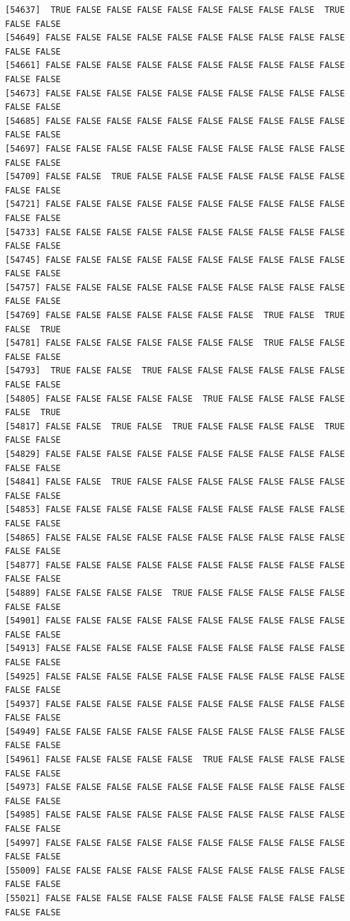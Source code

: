\documentclass[
  a4paper,
  DIV=11,
  numbers=noendperiod]{scrartcl}
\begin{document}
\begin{verbatim}
[54637]  TRUE FALSE FALSE FALSE FALSE FALSE FALSE FALSE FALSE  TRUE FALSE FALSE
[54649] FALSE FALSE FALSE FALSE FALSE FALSE FALSE FALSE FALSE FALSE FALSE FALSE
[54661] FALSE FALSE FALSE FALSE FALSE FALSE FALSE FALSE FALSE FALSE FALSE FALSE
[54673] FALSE FALSE FALSE FALSE FALSE FALSE FALSE FALSE FALSE FALSE FALSE FALSE
[54685] FALSE FALSE FALSE FALSE FALSE FALSE FALSE FALSE FALSE FALSE FALSE FALSE
[54697] FALSE FALSE FALSE FALSE FALSE FALSE FALSE FALSE FALSE FALSE FALSE FALSE
[54709] FALSE FALSE  TRUE FALSE FALSE FALSE FALSE FALSE FALSE FALSE FALSE FALSE
[54721] FALSE FALSE FALSE FALSE FALSE FALSE FALSE FALSE FALSE FALSE FALSE FALSE
[54733] FALSE FALSE FALSE FALSE FALSE FALSE FALSE FALSE FALSE FALSE FALSE FALSE
[54745] FALSE FALSE FALSE FALSE FALSE FALSE FALSE FALSE FALSE FALSE FALSE FALSE
[54757] FALSE FALSE FALSE FALSE FALSE FALSE FALSE FALSE FALSE FALSE FALSE FALSE
[54769] FALSE FALSE FALSE FALSE FALSE FALSE FALSE  TRUE FALSE  TRUE FALSE  TRUE
[54781] FALSE FALSE FALSE FALSE FALSE FALSE FALSE  TRUE FALSE FALSE FALSE FALSE
[54793]  TRUE FALSE FALSE  TRUE FALSE FALSE FALSE FALSE FALSE FALSE FALSE FALSE
[54805] FALSE FALSE FALSE FALSE FALSE  TRUE FALSE FALSE FALSE FALSE FALSE  TRUE
[54817] FALSE FALSE  TRUE FALSE  TRUE FALSE FALSE FALSE FALSE  TRUE FALSE FALSE
[54829] FALSE FALSE FALSE FALSE FALSE FALSE FALSE FALSE FALSE FALSE FALSE FALSE
[54841] FALSE FALSE  TRUE FALSE FALSE FALSE FALSE FALSE FALSE FALSE FALSE FALSE
[54853] FALSE FALSE FALSE FALSE FALSE FALSE FALSE FALSE FALSE FALSE FALSE FALSE
[54865] FALSE FALSE FALSE FALSE FALSE FALSE FALSE FALSE FALSE FALSE FALSE FALSE
[54877] FALSE FALSE FALSE FALSE FALSE FALSE FALSE FALSE FALSE FALSE FALSE FALSE
[54889] FALSE FALSE FALSE FALSE  TRUE FALSE FALSE FALSE FALSE FALSE FALSE FALSE
[54901] FALSE FALSE FALSE FALSE FALSE FALSE FALSE FALSE FALSE FALSE FALSE FALSE
[54913] FALSE FALSE FALSE FALSE FALSE FALSE FALSE FALSE FALSE FALSE FALSE FALSE
[54925] FALSE FALSE FALSE FALSE FALSE FALSE FALSE FALSE FALSE FALSE FALSE FALSE
[54937] FALSE FALSE FALSE FALSE FALSE FALSE FALSE FALSE FALSE FALSE FALSE FALSE
[54949] FALSE FALSE FALSE FALSE FALSE FALSE FALSE FALSE FALSE FALSE FALSE FALSE
[54961] FALSE FALSE FALSE FALSE FALSE  TRUE FALSE FALSE FALSE FALSE FALSE FALSE
[54973] FALSE FALSE FALSE FALSE FALSE FALSE FALSE FALSE FALSE FALSE FALSE FALSE
[54985] FALSE FALSE FALSE FALSE FALSE FALSE FALSE FALSE FALSE FALSE FALSE FALSE
[54997] FALSE FALSE FALSE FALSE FALSE FALSE FALSE FALSE FALSE FALSE FALSE FALSE
[55009] FALSE FALSE FALSE FALSE FALSE FALSE FALSE FALSE FALSE FALSE FALSE FALSE
[55021] FALSE FALSE FALSE FALSE FALSE FALSE FALSE FALSE FALSE FALSE FALSE FALSE

\end{verbatim}
\end{document}
